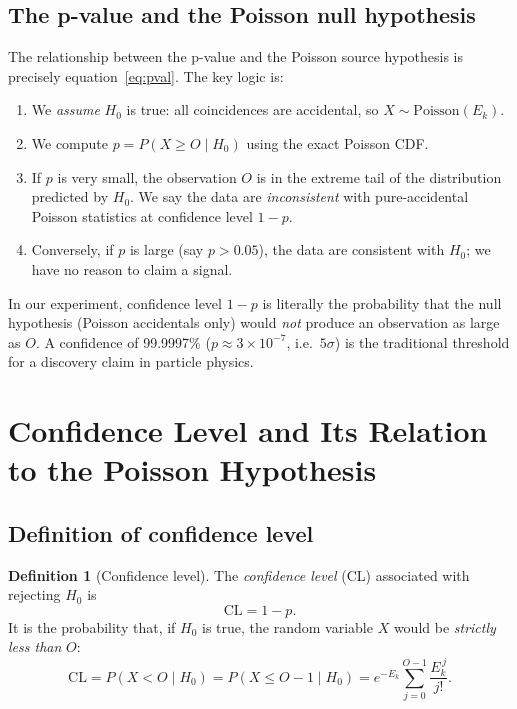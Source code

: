 \documentclass[12pt]{article}
\theoremstyle{definition}
\newtheorem{definition}{Definition}
\theoremstyle{remark}
\newcommand{\Prob}[1]{P\!\left(#1\right)}
\newcommand{\Ho}{H_0}
\newcommand{\obs}{O}
\newcommand{\Eacc}{E}
\newcommand{\nsig}{\sigma}
\begin{document}
\subsection{The p-value and the Poisson null hypothesis}

The relationship between the p-value and the Poisson source hypothesis
is precisely equation~\eqref{eq:pval}.  The key logic is:

\begin{enumerate}
  \item We \emph{assume} $\Ho$ is true: all coincidences are accidental,
        so $X \sim \mathrm{Poisson}(\Eacc_k)$.
  \item We compute $p = \Prob{X \ge \obs \mid \Ho}$ using the exact
        Poisson CDF.
  \item If $p$ is very small, the observation $\obs$ is in the extreme
        tail of the distribution predicted by $\Ho$.  We say the data
        are \emph{inconsistent} with pure-accidental Poisson statistics
        at confidence level $1 - p$.
  \item Conversely, if $p$ is large (say $p > 0.05$), the data are
        consistent with $\Ho$; we have no reason to claim a signal.
\end{enumerate}

In our experiment, confidence level $1 - p$ is literally the probability
that the null hypothesis (Poisson accidentals only) would \emph{not}
produce an observation as large as $\obs$.  A confidence of 99.9997\%
($p \approx 3 \times 10^{-7}$, i.e.\ $5\nsig$) is the traditional
threshold for a discovery claim in particle physics.

\section{Confidence Level and Its Relation to the Poisson Hypothesis}
\label{sec:confidence}

\subsection{Definition of confidence level}

\begin{definition}[Confidence level]
  The \emph{confidence level} (CL) associated with rejecting $\Ho$ is
  \begin{equation}
    \text{CL} = 1 - p.
    \label{eq:cl}
  \end{equation}
  It is the probability that, if $\Ho$ is true, the random variable $X$
  would be \emph{strictly less than} $\obs$:
  \begin{equation}
    \text{CL} = \Prob{X < \obs \mid \Ho}
    = \Prob{X \le \obs - 1 \mid \Ho}
    = e^{-\Eacc_k}\sum_{j=0}^{\obs-1}\frac{\Eacc_k^{\,j}}{j!}.
    \label{eq:cl-poisson}
  \end{equation}
\end{definition}
\end{document}
